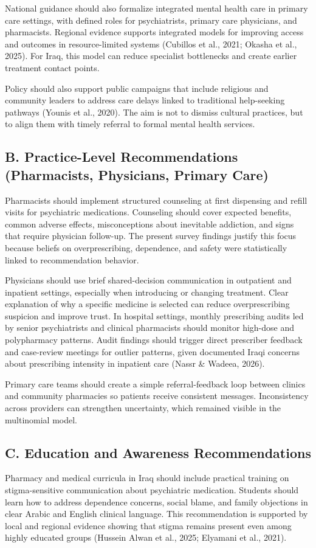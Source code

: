 \documentclass[12pt,a4paper]{article}
\begin{document}
National guidance should also formalize integrated mental health care in primary care settings, with defined roles for psychiatrists, primary care physicians, and pharmacists. Regional evidence supports integrated models for improving access and outcomes in resource-limited systems (Cubillos et al., 2021; Okasha et al., 2025). For Iraq, this model can reduce specialist bottlenecks and create earlier treatment contact points.

Policy should also support public campaigns that include religious and community leaders to address care delays linked to traditional help-seeking pathways (Younis et al., 2020). The aim is not to dismiss cultural practices, but to align them with timely referral to formal mental health services.

\subsection*{B. Practice-Level Recommendations (Pharmacists, Physicians, Primary Care)}
Pharmacists should implement structured counseling at first dispensing and refill visits for psychiatric medications. Counseling should cover expected benefits, common adverse effects, misconceptions about inevitable addiction, and signs that require physician follow-up. The present survey findings justify this focus because beliefs on overprescribing, dependence, and safety were statistically linked to recommendation behavior.

Physicians should use brief shared-decision communication in outpatient and inpatient settings, especially when introducing or changing treatment. Clear explanation of why a specific medicine is selected can reduce overprescribing suspicion and improve trust. In hospital settings, monthly prescribing audits led by senior psychiatrists and clinical pharmacists should monitor high-dose and polypharmacy patterns. Audit findings should trigger direct prescriber feedback and case-review meetings for outlier patterns, given documented Iraqi concerns about prescribing intensity in inpatient care (Nassr \& Wadeea, 2026).

Primary care teams should create a simple referral-feedback loop between clinics and community pharmacies so patients receive consistent messages. Inconsistency across providers can strengthen uncertainty, which remained visible in the multinomial model.

\subsection*{C. Education and Awareness Recommendations}
Pharmacy and medical curricula in Iraq should include practical training on stigma-sensitive communication about psychiatric medication. Students should learn how to address dependence concerns, social blame, and family objections in clear Arabic and English clinical language. This recommendation is supported by local and regional evidence showing that stigma remains present even among highly educated groups (Hussein Alwan et al., 2025; Elyamani et al., 2021).
\end{document}
